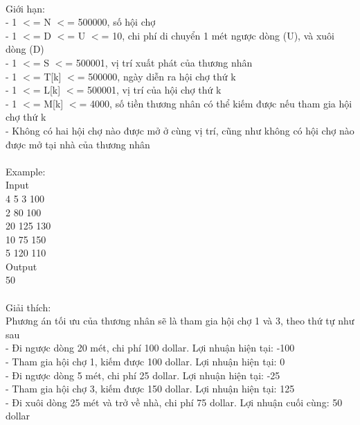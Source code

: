 \\   Giới hạn:   
\\   - 1 $<$= N $<$= 500000, số hội chợ   
\\   - 1 $<$= D $<$= U $<$= 10, chi phí di chuyển 1 mét ngược dòng (U), và xuôi dòng (D)   
\\   - 1 $<$= S $<$= 500001, vị trí xuất phát của thương nhân   
\\   - 1 $<$= T[k] $<$= 500000, ngày diễn ra hội chợ thứ k   
\\   - 1 $<$= L[k] $<$= 500001, vị trí của hội chợ thứ k   
\\   - 1 $<$= M[k] $<$= 4000, số tiền thương nhân có thể kiếm được nếu tham gia hội chợ thứ k   
\\   - Không có hai hội chợ nào được mở ở cùng vị trí, cũng như không có hội chợ nào được mở tại nhà của thương nhân   
\\
\\   Example:   
\\   Input   
\\   4 5 3 100   
\\   2 80 100   
\\   20 125 130   
\\   10 75 150   
\\   5 120 110   
\\   Output   
\\   50   
\\
\\   Giải thích:   
\\   Phương án tối ưu của thương nhân sẽ là tham gia hội chợ 1 và 3, theo thứ tự như sau   
\\   - Đi ngược dòng 20 mét, chi phí 100 dollar. Lợi nhuận hiện tại: -100   
\\   - Tham gia hội chợ 1, kiếm được 100 dollar. Lợi nhuận hiện tại: 0   
\\   - Đi ngược dòng 5 mét, chi phí 25 dollar. Lợi nhuận hiện tại: -25   
\\   - Tham gia hội chợ 3, kiếm được 150 dollar. Lợi nhuận hiện tại: 125   
\\   - Đi xuôi dòng 25 mét và trở về nhà, chi phí 75 dollar. Lợi nhuận cuối cùng: 50 dollar  